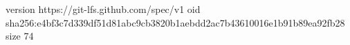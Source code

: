version https://git-lfs.github.com/spec/v1
oid sha256:e4bf3c7d339df51d81abc9cb3820b1aebdd2ac7b43610016e1b91b89ea92fb28
size 74
